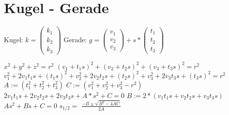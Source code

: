 \documentclass[12pt,a4paper]{article}
\begin{document}
\section*{Kugel - Gerade}

Kugel: $k = \left(\begin{array}{c} k_1 \\ k_2 \\ k_3 \end{array}\right)$ \newline
Gerade: $g = \left(\begin{array}{c} v_1 \\ v_2 \\ v_3 \end{array}\right) + s*
\left(\begin{array}{c} t_1 \\ t_2 \\ t_3 \end{array}\right)$\newline\newline
\begin{doublespace}
$x^2 + y^2 + z^2 = r^2$\newline
$(v_1 + t_1s)^2 + (v_2 + t_2s)^2 + (v_3 + t_3s)^2 = r^2$\newline
$v_1^2 + 2v_1t_1s + (t_1s)^2 + v_2^2 + 2v_2t_2s + (t_2s)^2 + v_3^2 + 2v_3t_3s + (t_3s)^2 = r^2$\newline
$A:=(t_1^2 + t_2^2 + t_3^2)$\newline
$C:=(v_1^2 + v_2^2 + v_3^2 - r^2)$\newline
$2v_1t_1s  + 2v_2t_2s + 2v_3t_3s + A*s^2 + C = 0$\newline
$B:= 2*(v_1t_1s  + v_2t_2s + v_3t_3s)$\newline
$As^2 + Bs + C = 0$\newline
$s_{1/2} =$ {\Large$\frac{-B \pm \sqrt{B^2 - 4AC}}{2A}$}
\end{doublespace}
\end{document}

